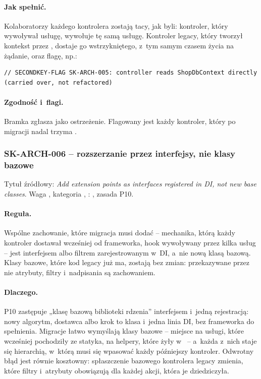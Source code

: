 \paragraph{Jak spełnić.} Kolaboratorzy każdego kontrolera zostają tacy, jak byli: kontroler,
który wywoływał usługę, wywołuje tę samą usługę. Kontroler legacy, który tworzył kontekst
przez , dostaje go wstrzykniętego, z~tym samym czasem życia na żądanie, oraz
flagę, np.:

\begin{lstlisting}
// SECONDKEY-FLAG SK-ARCH-005: controller reads ShopDbContext directly (carried over, not refactored)
\end{lstlisting}

\paragraph{Zgodność i~flagi.} Bramka zgłasza 
jako ostrzeżenie. Flagowany jest każdy kontroler, który po migracji nadal trzyma
.


\subsubsection{SK-ARCH-006 -- rozszerzanie przez interfejsy, nie klasy bazowe}\label{sec:standardy-sk-arch-006}

Tytuł źródłowy: \emph{Add extension points as interfaces registered in DI, not new base
classes}. Waga , kategoria ,
: , zasada P10.

\paragraph{Reguła.} Wspólne zachowanie, które migracja musi dodać -- mechanika, którą każdy
kontroler dostawał wcześniej od frameworka, hook wywoływany przez kilka usług -- jest
interfejsem albo filtrem zarejestrowanym w~DI, a~nie nową klasą bazową. Klasy bazowe, które
kod legacy już ma, zostają bez zmian: przekazywane przez nie atrybuty, filtry i~nadpisania są
zachowaniem.

\paragraph{Dlaczego.} P10 zastępuje „klasę bazową biblioteki rdzenia” interfejsem i~jedną
rejestracją: nowy algorytm, dostawca albo krok to klasa i~jedna linia DI, bez frameworka do
spełnienia. Migracje łatwo wymyślają klasy bazowe -- miejsce na usługi, które wcześniej
pochodziły ze statyka, na helpery, które żyły w~ -- a~każda z~nich
staje się hierarchią, w~którą musi się wpasować każdy późniejszy kontroler. Odwrotny błąd
jest równie kosztowny: spłaszczenie bazowego kontrolera legacy zmienia, które filtry
i~atrybuty obowiązują dla każdej akcji, która je dziedziczyła.

